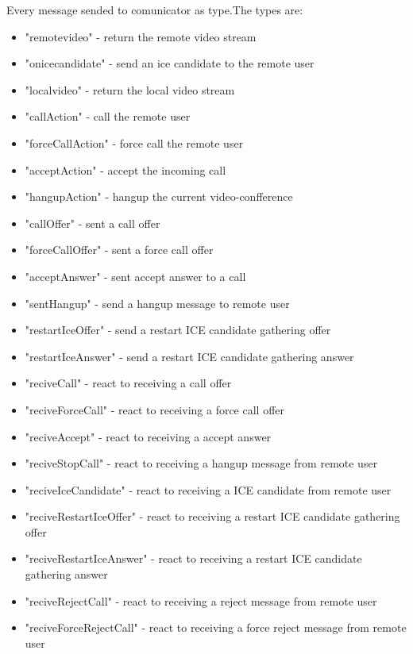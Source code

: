 Every message sended to comunicator as type.The types are:
\begin{itemize}
            \item "remotevideo" - return the remote video stream
            \item "onicecandidate" - send an ice candidate to the remote user
            \item "localvideo" - return the local video stream
            \item "callAction" - call the remote user
            \item "forceCallAction" - force call the remote user
            \item "acceptAction" - accept the incoming call
            \item "hangupAction" - hangup the current video-confference
            \item "callOffer" - sent a call offer
            \item "forceCallOffer" - sent a force call offer
            \item "acceptAnswer" - sent accept answer to a call
            \item "sentHangup" - send a hangup message to remote user
            \item "restartIceOffer" - send a restart ICE candidate gathering offer
            \item "restartIceAnswer" - send a restart ICE candidate gathering answer
            \item "reciveCall" - react to receiving a call offer
            \item "reciveForceCall" - react to receiving a force call offer
            \item "reciveAccept" - react to receiving a accept answer
            \item "reciveStopCall" - react to receiving a hangup message from remote user
            \item "reciveIceCandidate" - react to receiving a ICE candidate from remote user
            \item "reciveRestartIceOffer" - react to receiving a restart ICE candidate gathering offer
            \item "reciveRestartIceAnswer" - react to receiving a restart ICE candidate gathering answer
            \item "reciveRejectCall" - react to receiving a reject message from remote user
            \item "reciveForceRejectCall" - react to receiving a force reject message from remote user

\end{itemize}
